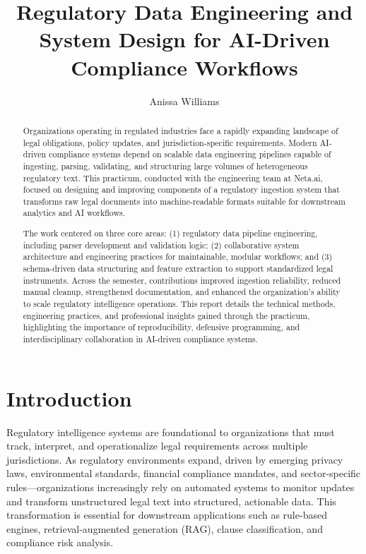 \documentclass[sigconf]{acmart}
\title{Regulatory Data Engineering and System Design for AI-Driven Compliance Workflows}
\author{Anissa Williams}
\affiliation{
  \institution{College of Charleston}
  \city{Charleston}
  \state{South Carolina}
  \country{USA}
}
\affiliation{
  \institution{Neta.ai}
}
\begin{document}
\begin{abstract}
Organizations operating in regulated industries face a rapidly expanding landscape of legal obligations, policy updates, and jurisdiction-specific requirements. Modern AI-driven compliance systems depend on scalable data engineering pipelines capable of ingesting, parsing, validating, and structuring large volumes of heterogeneous regulatory text. This practicum, conducted with the engineering team at Neta.ai, focused on designing and improving components of a regulatory ingestion system that transforms raw legal documents into machine-readable formats suitable for downstream analytics and AI workflows.

The work centered on three core areas: (1) regulatory data pipeline engineering, including parser development and validation logic; (2) collaborative system architecture and engineering practices for maintainable, modular workflows; and (3) schema-driven data structuring and feature extraction to support standardized legal instruments. Across the semester, contributions improved ingestion reliability, reduced manual cleanup, strengthened documentation, and enhanced the organization’s ability to scale regulatory intelligence operations. This report details the technical methods, engineering practices, and professional insights gained through the practicum, highlighting the importance of reproducibility, defensive programming, and interdisciplinary collaboration in AI-driven compliance systems.
\end{abstract}

\maketitle

\section{Introduction}
Regulatory intelligence systems are foundational to organizations that must track, interpret, and operationalize legal requirements across multiple jurisdictions. As regulatory environments expand, driven by emerging privacy laws, environmental standards, financial compliance mandates, and sector-specific rules—organizations increasingly rely on automated systems to monitor updates and transform unstructured legal text into structured, actionable data. This transformation is essential for downstream applications such as rule-based engines, retrieval-augmented generation (RAG), clause classification, and compliance risk analysis.
\end{document}
